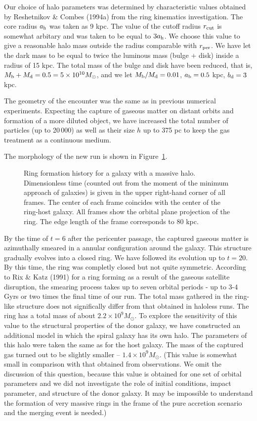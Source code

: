 Our choice of halo parameters was determined by characteristic values 
obtained by Reshetnikov \& Combes (1994a) from the ring kinematics 
investigation. The core radius $a_{\rm h}$ was taken as 9 kpc. 
The value of the cutoff radius $r_{\rm cut}$ is somewhat 
arbitary and was taken to be equal to $3a_{\rm h}$. We choose 
this value to give a reasonable halo mass outside the radius comparable with 
$r_{\rm per}$. 
We have let the dark mass to be equal to twice
the luminous mass (bulge $+$ disk) inside a radius of 15 kpc.  
The total mass of the bulge and disk have been reduced, 
that is, $M_{\rm b} + M_{\rm d} = 0.5 = 5\times10^{10} M_{\odot}$, and 
we let $M_{\rm b}/M_{\rm d}=0.01$, $a_{\rm b} = 0.5$ kpc, 
$b_{\rm d} = 3$ kpc. 

The geometry of the 
encounter was the same as in previous numerical experiments. 
Expecting the capture of gaseous matter on distant orbits and 
formation of a more diluted object, we have increased the total 
number of particles (up to 20\,000) as well as their size $h$ 
up to 375 pc to keep the gas treatment as a continuous medium.    

The morphology of the new run is shown in 
Figure~\ref{Fhalo}. 
\begin{figure}
\picplace{0.8cm}
\caption{Ring formation history for a galaxy with a massive halo. 
Dimensionless time (counted out from the moment of the minimum approach 
of galaxies) is given in the upper right-hand corner of all frames. 
The center of each frame coincides with the center of the ring-host 
galaxy. All frames show the orbital plane projection of the ring. The 
edge length of the frame corresponds to 80 kpc.} 
\label{Fhalo}
\end{figure}   
By the time of $t=6$ after the pericenter 
passage, the captured gaseous matter is azimuthally 
smeared in a annular configuration around the galaxy. 
This structure gradually evolves into a closed ring. We 
have followed its evolution up to $t=20$. By this time, the 
ring was completly closed but not quite symmetric. 
According to Rix \& Katz (1991) for a ring forming 
as a result of the gaseous satellite disruption, the smearing process takes 
up to seven orbital periods - up to 3-4 Gyrs or two times 
the final time of our run. The total mass gathered in the 
ring-like structure does not significally differ from that obtained in 
haloless runs. The ring has a total mass of about 
$2.2\times10^9 M_{\odot}$. 
To explore the sensitivity of this value to the structural
properties of the donor galaxy, we have constructed an additional
model in which the spiral galaxy has its own halo. The parameters
of this halo were taken the same as for the host galaxy. The mass
of the captured gas turned out to be slightly smaller --
$1.4\times10^{9} M_{\odot}$.
(This value is somewhat small in comparison with 
that obtained from observations. We 
omit the discussion of this question, because this value is obtained 
for one set of orbital parameters and we did not investigate the role 
of initial conditions, impact parameter, and structure of the donor galaxy.
It may be impossible to understand the formation of very
massive rings in the frame of the pure accretion scenario and
the merging event is needed.)
 
